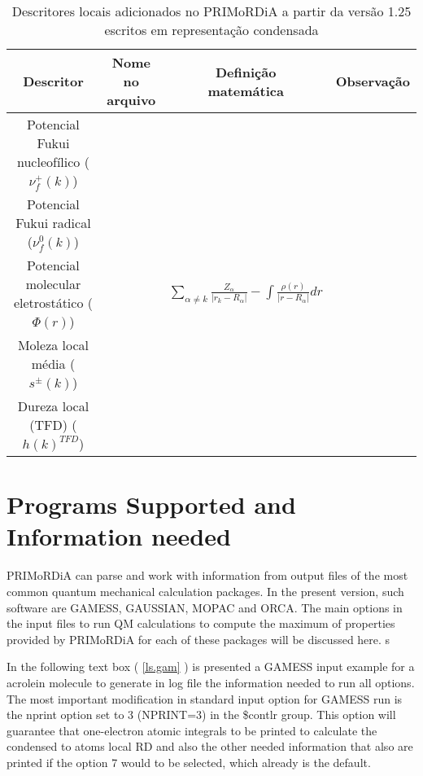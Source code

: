 \documentclass[a4paper,11pt]{refart}
\begin{document}
\hspace*{-\leftmarginwidth}
\begin{minipage}{\fullwidth}
	\begin{table}[H]
		\centering	
		\caption{Descritores locais adicionados no PRIMoRDiA a partir da versão 1.25 escritos em representação condensada}
		\begin{tabular}{c|c|c|c}
			\toprule
			Descritor &\makecell{Nome no\\ arquivo}&\makecell{Definição\\matemática}& Observação \\
			\midrule	
			\makecell{Potencial Fukui \\nucleofílico ($\nu_{f}^{+}(k)$)}  &  &  &  \\ \hline
			\makecell{Potencial Fukui \\radical ($\nu_{f}^{0}(k)$) }&  &  &  \\ \hline
			\makecell{Potencial molecular\\ eletrostático ( $\Phi(r)$) } & & $\sum_{\alpha \neq k} \frac{Z_{\alpha}}{|r_k-R_{\alpha}|}  - \int \frac{\rho(r)}{|r-R_{\alpha}|} dr$  & \\ \hline
			\makecell{Moleza local \\média ($s^{\pm}(k)$)}  &  &  &   \\ \hline			
			\makecell{Dureza local\\ (TFD) ($h(k)^{TFD}$)} & & &  \\
			\bottomrule
		\end{tabular} 
		\label{tab_local4}	
	\end{table}	
\end{minipage}



\section{Programs Supported and Information needed}

PRIMoRDiA can parse and work with information from output files of the most common quantum mechanical calculation packages. In the present version, such software are GAMESS, GAUSSIAN, MOPAC and ORCA. The main options in the input files to run QM calculations to compute the maximum of properties provided by PRIMoRDiA for each of these packages will be discussed here. 
s

In the following text box ( \autoref{ls.gam} ) is presented a GAMESS input example for a acrolein molecule to generate in log file the information needed to run all options. The most important modification in standard input option for GAMESS run is the nprint option set to 3 (NPRINT=3) in the \$contlr group. This option will guarantee that one-electron atomic integrals to be printed to calculate the condensed to atoms local RD and also the other needed information that also are printed if the option 7 would to be selected, which already is the default. 
  
\end{document}
